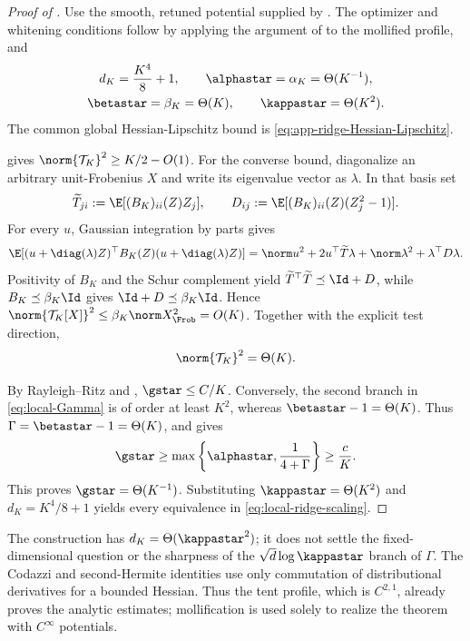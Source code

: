 \begin{proof}[Proof of ]
Use the smooth, retuned potential supplied by
.  The optimizer and whitening conditions
follow by applying the argument of
 to the mollified profile, and
\begin{equation}
  \begin{gathered}
    d_K=\frac{K^4}{8}+1,\qquad
    \alphastar=\alpha_K=\Theta(K^{-1}),\\
    \betastar=\beta_K=\Theta(K),\qquad
    \kappastar=\Theta(K^2).
  \end{gathered}
  \label{eq:app-ridge-final-scaling}
\end{equation}
The common global Hessian-Lipschitz bound is
\eqref{eq:app-ridge-Hessian-Lipschitz}.

 gives
\(\norm{\mathcal T_K}^2\geq K/2-O(1)\).  For the converse bound,
diagonalize an arbitrary unit-Frobenius \(X\) and write its eigenvalue
vector as \(\lambda\).  In that basis set
\[
  \widetilde T_{ji}:=\E[(B_K)_{ii}(Z)Z_j],
  \qquad
  D_{ij}:=\E[(B_K)_{ii}(Z)(Z_j^2-1)].
\]
For every \(u\), Gaussian integration by parts gives
\[
  \E[(u+\diag(\lambda)Z)^\top
      B_K(Z)(u+\diag(\lambda)Z)]
  =
  \norm u^2+2u^\top\widetilde T\lambda
  +\norm\lambda^2+\lambda^\top D\lambda.
\]
Positivity of \(B_K\) and the Schur complement yield
\(\widetilde T^\top\widetilde T\preceq\Id+D\), while
\(B_K\preceq\beta_K\Id\) gives
\(\Id+D\preceq\beta_K\Id\).  Hence
\(\norm{\mathcal T_K[X]}^2\leq\beta_K\norm X_{\Frob}^2=O(K)\).
Together with the explicit test direction,
\begin{equation}
  \norm{\mathcal T_K}^2=\Theta(K).
  \label{eq:app-ridge-operator-size}
\end{equation}

By Rayleigh--Ritz and ,
\(\gstar\leq C/K\).  Conversely, the second branch in
\eqref{eq:local-Gamma} is of order at least \(K^2\), whereas
\(\betastar-1=\Theta(K)\).  Thus
\(\Gamma=\betastar-1=\Theta(K)\), and
 gives
\[
  \gstar
  \geq
  \max\left\{\alphastar,\frac1{4+\Gamma}\right\}
  \geq\frac cK.
\]
This proves \(\gstar=\Theta(K^{-1})\).  Substituting
\(\kappastar=\Theta(K^2)\) and
\(d_K=K^4/8+1\) yields every equivalence in
\eqref{eq:local-ridge-scaling}.
\end{proof}

\begin{remark}
\label{rem:app-ridge-scope}
The construction has
\(d_K=\Theta(\kappastar^2)\); it does not settle the fixed-dimensional
question or the sharpness of the
\(\sqrt d\log\kappastar\) branch of \(\Gamma\).
The Codazzi and second-Hermite identities use only commutation of
distributional derivatives for a bounded Hessian.  Thus the tent profile,
which is \(C^{2,1}\), already proves the analytic estimates; mollification is
used solely to realize the theorem with \(C^\infty\) potentials.
\end{remark}
